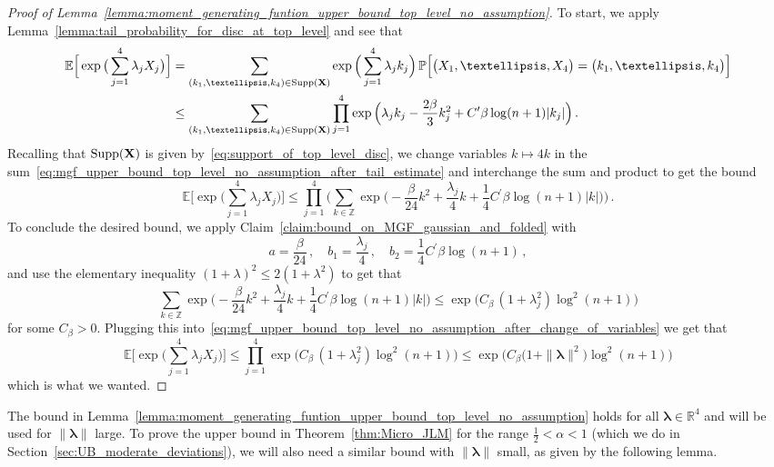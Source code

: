 \documentclass[11pt]{amsart}
\theoremstyle{definition}
\theoremstyle{remark}
\numberwithin{equation}{section}
\def\la{{\lambda}}
\newcommand{\bR}{\mathbb R}
\newcommand{\bZ}{\mathbb Z}
\newcommand{\bP}{\mathbb P}
\newcommand{\bE}{\mathbb E}
\begin{document}
	\begin{proof}[Proof of Lemma~\ref{lemma:moment_generating_funtion_upper_bound_top_level_no_assumption}]
		To start, we apply Lemma~\ref{lemma:tail_probability_for_disc_at_top_level} and see that
		\begin{align}
			\label{eq:mgf_upper_bound_top_level_no_assumption_after_tail_estimate}
			\nonumber
			\bE\Big[\exp\big(\sum_{j=1}^{4}\la_j X_j\big)\Big] &= \sum_{(k_1,\ldots,k_4)\in \text{Supp}(\bf{X})} \exp\Big(\sum_{j=1}^4 \la_j k_j\Big) \, \bP\Big[\big(X_1,\ldots,X_4\big) = \big(k_1,\ldots,k_4\big)\Big] \\
			& \le \sum_{(k_1,\ldots,k_4)\in \text{Supp}(\bf{X})}\prod_{j=1}^{4}\exp\Big(\la_j k_j-\frac{2\beta}{3}k_j^2 + C^\prime \beta \log(n+1)|k_j| \Big) \, .
		\end{align}
		Recalling that $\text{Supp}(\bf{X})$ is given by~\eqref{eq:support_of_top_level_disc}, we change variables $k\mapsto 4k$ in the sum~\eqref{eq:mgf_upper_bound_top_level_no_assumption_after_tail_estimate} and interchange the sum and product to get the bound 
		\begin{equation}
			\label{eq:mgf_upper_bound_top_level_no_assumption_after_change_of_variables}
			\bE\Big[\exp\big(\sum_{j=1}^{4}\la_j X_j\big)\Big] \le  \prod_{j=1}^{4} \Bigg(\sum_{k\in \bZ} \exp\Big(-\frac{\beta}{24}k^2 + \frac{\la_j}{4} k + \frac{1}{4}C^\prime \beta \log(n+1)|k| \Big)\Bigg) \, .
		\end{equation}
		To conclude the desired bound, we apply Claim~\ref{claim:bound_on_MGF_gaussian_and_folded} with 
		\[
		a = \frac{\beta}{24} \, , \quad  b_1 = \frac{\lambda_j}{4} \, , \quad  b_2= \frac{1}{4}C^\prime \beta\log(n+1) \, ,
		\]
		and use the elementary inequality $(1+\la)^2\le 2(1+\la^2)$ to get that
		\begin{equation*}
			\sum_{k\in \bZ}\exp\Big(-\frac{\beta}{24}k^2 + \frac{\la_j}{4} k + \frac{1}{4}C^\prime \beta \log(n+1)|k| \Big) \le \exp\Big(C_\beta \,(1 + \la_j^2) \log^2(n+1)\Big)
		\end{equation*}
		for some $C_\beta>0$. Plugging this into~\eqref{eq:mgf_upper_bound_top_level_no_assumption_after_change_of_variables} we get that
		\[
		\bE\Big[\exp\big(\sum_{j=1}^{4}\la_j X_j\big)\Big] \le \prod_{j=1}^{4} \exp\Big(C_\beta \,(1 + \la_j^2) \log^2(n+1)\Big) \le \exp\Big(C_\beta \big(1 + \| \boldsymbol{\la} \|^2\big) \log^2(n+1) \Big)
		\]
		which is what we wanted.
	\end{proof}
	The bound in Lemma~\ref{lemma:moment_generating_funtion_upper_bound_top_level_no_assumption} holds for all $\boldsymbol{\la} \in \bR^4$ and will be used for $\| \boldsymbol{\la} \|$ large. To prove the upper bound in Theorem~\ref{thm:Micro_JLM} for the range $\tfrac{1}{2} < \alpha<1$ (which we do in Section~\ref{sec:UB_moderate_deviations}), we will also need a similar bound with $\| \boldsymbol{\la} \|$ small, as given by the following lemma.
\end{document}

